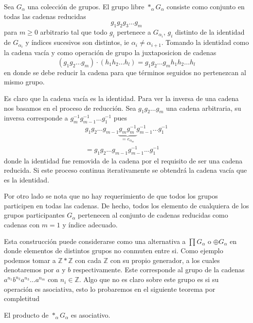 \begin{definicion}
  Sea \(G_\alpha\) una colección de grupos. El grupo libre \(*_\alpha
  G_\alpha \) consiste como conjunto en todas las cadenas reducidas
  \[ g_1 g_2 g_3 \dots g_m \]
  para \(m \geq 0\) arbitrario tal que todo \(g_i\) pertenece a
  \(G_{\alpha_i}\), \(g_i\) distinto de la identidad de
  \(G_{\alpha_i}\) y índices sucesivos son distintos, ie \(\alpha_i \neq
  \alpha_{i + 1}\). Tomando la identidad como la cadena vacía y como
  operación de grupo la juxtaposicion de cadenas
  \[ (g_1 g_2 \dots g_m ) \cdot (h_1 h_2 \dots h_l) = g_1 g_2 \dots g_m
    h_1 h_2 \dots h_l \]
  en donde se debe reducir la cadena para que términos seguidos no
  pertenezcan al mismo grupo.
\end{definicion}
\begin{acotacion}
  Es claro que la cadena vacía es la identidad. Para ver la inversa de
  una cadena nos basamos en el proceso de reducción. Sea \(g_1 g_2 \dots
  g_m\) una cadena arbitraria, su inversa corresponde a \(g_m^{-1} g_{m-1}^{-1}
  \dots g_1^{-1}\) pues
  \begin{gather*}
    g_1 g_2 \dots g_{m-1} \underbrace{g_m g_m^{-1}}_{= e_{\alpha_m}}
      g_{m-1}^{-1} \dots g_1^{-1} \\
    = g_1 g_2 \dots g_{m-1} g_{m-1}^{-1} \dots g_1^{-1}
  \end{gather*}
  donde la identidad fue removida de la cadena por el requisito de ser
  una cadena reducida. Si este proceso continua iterativamente se
  obtendrá la cadena vacía que es la identidad.

  Por otro lado se nota que no hay requerimiento de que todos los grupos
  participen en todas las cadenas. De hecho, todos los elemento de
  cualquiera de los grupos participantes \(G_\alpha\) pertenecen al
  conjunto de cadenas reducidas como cadenas con \(m = 1\) y índice
  adecuado.
\end{acotacion}
Esta construcción puede considerarse como una alternativa a \(\prod
G_\alpha\) o \(\oplus G_\alpha\) en donde elementos de distintos grupos
no conmuten entre si. Como ejemplo podemos tomar a \(\mathbb Z * \mathbb
Z\) con cada \(\mathbb Z\) con su propio generador, a los cuales
denotaremos por \(a\) y \(b\) respectivamente. Este corresponde al grupo
de la cadenas \(a^{n_1} b^{n_2} a^{n_3} \dots a^{n_m}\) con \(n_i \in
\mathbb Z \). Algo que no es claro sobre este grupo es si
su operación es asociativa, esto lo probaremos en el siguiente teorema
por completitud
\begin{teorema}
  El producto de \(*_\alpha G_\alpha\) es asociativo.
\end{teorema}
